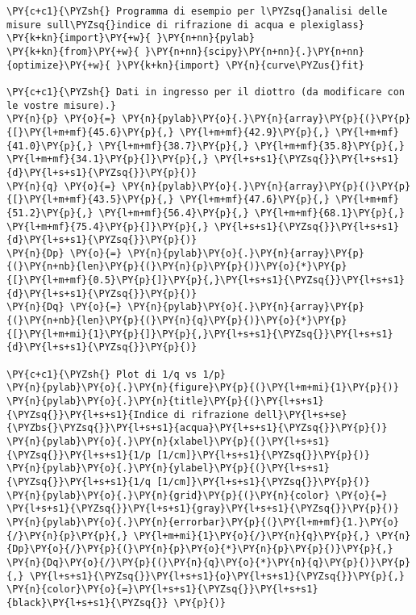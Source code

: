 \begin{Verbatim}[label=\makebox{\href{https://github.com/unipi-physics-labs/lab1-sheets/tree/main/snippy/refraction_index.py}{https://github.com/.../refraction\_index.py}},commandchars=\\\{\}]
\PY{c+c1}{\PYZsh{} Programma di esempio per l\PYZsq{}analisi delle misure sull\PYZsq{}indice di rifrazione di acqua e plexiglass}
\PY{k+kn}{import}\PY{+w}{ }\PY{n+nn}{pylab}
\PY{k+kn}{from}\PY{+w}{ }\PY{n+nn}{scipy}\PY{n+nn}{.}\PY{n+nn}{optimize}\PY{+w}{ }\PY{k+kn}{import} \PY{n}{curve\PYZus{}fit}

\PY{c+c1}{\PYZsh{} Dati in ingresso per il diottro (da modificare con le vostre misure).}
\PY{n}{p} \PY{o}{=} \PY{n}{pylab}\PY{o}{.}\PY{n}{array}\PY{p}{(}\PY{p}{[}\PY{l+m+mf}{45.6}\PY{p}{,} \PY{l+m+mf}{42.9}\PY{p}{,} \PY{l+m+mf}{41.0}\PY{p}{,} \PY{l+m+mf}{38.7}\PY{p}{,} \PY{l+m+mf}{35.8}\PY{p}{,} \PY{l+m+mf}{34.1}\PY{p}{]}\PY{p}{,} \PY{l+s+s1}{\PYZsq{}}\PY{l+s+s1}{d}\PY{l+s+s1}{\PYZsq{}}\PY{p}{)}
\PY{n}{q} \PY{o}{=} \PY{n}{pylab}\PY{o}{.}\PY{n}{array}\PY{p}{(}\PY{p}{[}\PY{l+m+mf}{43.5}\PY{p}{,} \PY{l+m+mf}{47.6}\PY{p}{,} \PY{l+m+mf}{51.2}\PY{p}{,} \PY{l+m+mf}{56.4}\PY{p}{,} \PY{l+m+mf}{68.1}\PY{p}{,} \PY{l+m+mf}{75.4}\PY{p}{]}\PY{p}{,} \PY{l+s+s1}{\PYZsq{}}\PY{l+s+s1}{d}\PY{l+s+s1}{\PYZsq{}}\PY{p}{)}
\PY{n}{Dp} \PY{o}{=} \PY{n}{pylab}\PY{o}{.}\PY{n}{array}\PY{p}{(}\PY{n+nb}{len}\PY{p}{(}\PY{n}{p}\PY{p}{)}\PY{o}{*}\PY{p}{[}\PY{l+m+mf}{0.5}\PY{p}{]}\PY{p}{,}\PY{l+s+s1}{\PYZsq{}}\PY{l+s+s1}{d}\PY{l+s+s1}{\PYZsq{}}\PY{p}{)}
\PY{n}{Dq} \PY{o}{=} \PY{n}{pylab}\PY{o}{.}\PY{n}{array}\PY{p}{(}\PY{n+nb}{len}\PY{p}{(}\PY{n}{q}\PY{p}{)}\PY{o}{*}\PY{p}{[}\PY{l+m+mi}{1}\PY{p}{]}\PY{p}{,}\PY{l+s+s1}{\PYZsq{}}\PY{l+s+s1}{d}\PY{l+s+s1}{\PYZsq{}}\PY{p}{)}

\PY{c+c1}{\PYZsh{} Plot di 1/q vs 1/p}
\PY{n}{pylab}\PY{o}{.}\PY{n}{figure}\PY{p}{(}\PY{l+m+mi}{1}\PY{p}{)}
\PY{n}{pylab}\PY{o}{.}\PY{n}{title}\PY{p}{(}\PY{l+s+s1}{\PYZsq{}}\PY{l+s+s1}{Indice di rifrazione dell}\PY{l+s+se}{\PYZbs{}\PYZsq{}}\PY{l+s+s1}{acqua}\PY{l+s+s1}{\PYZsq{}}\PY{p}{)}
\PY{n}{pylab}\PY{o}{.}\PY{n}{xlabel}\PY{p}{(}\PY{l+s+s1}{\PYZsq{}}\PY{l+s+s1}{1/p [1/cm]}\PY{l+s+s1}{\PYZsq{}}\PY{p}{)} 
\PY{n}{pylab}\PY{o}{.}\PY{n}{ylabel}\PY{p}{(}\PY{l+s+s1}{\PYZsq{}}\PY{l+s+s1}{1/q [1/cm]}\PY{l+s+s1}{\PYZsq{}}\PY{p}{)} 
\PY{n}{pylab}\PY{o}{.}\PY{n}{grid}\PY{p}{(}\PY{n}{color} \PY{o}{=} \PY{l+s+s1}{\PYZsq{}}\PY{l+s+s1}{gray}\PY{l+s+s1}{\PYZsq{}}\PY{p}{)}
\PY{n}{pylab}\PY{o}{.}\PY{n}{errorbar}\PY{p}{(}\PY{l+m+mf}{1.}\PY{o}{/}\PY{n}{p}\PY{p}{,} \PY{l+m+mi}{1}\PY{o}{/}\PY{n}{q}\PY{p}{,} \PY{n}{Dp}\PY{o}{/}\PY{p}{(}\PY{n}{p}\PY{o}{*}\PY{n}{p}\PY{p}{)}\PY{p}{,} \PY{n}{Dq}\PY{o}{/}\PY{p}{(}\PY{n}{q}\PY{o}{*}\PY{n}{q}\PY{p}{)}\PY{p}{,} \PY{l+s+s1}{\PYZsq{}}\PY{l+s+s1}{o}\PY{l+s+s1}{\PYZsq{}}\PY{p}{,} \PY{n}{color}\PY{o}{=}\PY{l+s+s1}{\PYZsq{}}\PY{l+s+s1}{black}\PY{l+s+s1}{\PYZsq{}} \PY{p}{)}


\end{Verbatim}
